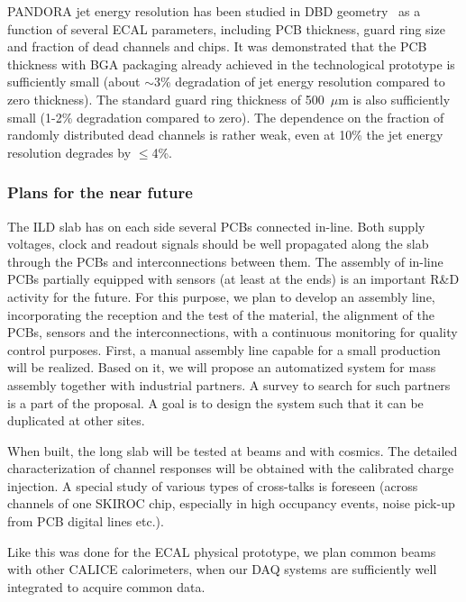 \documentclass{article}
\begin{document}
PANDORA jet energy resolution has been studied in DBD geometry~\cite{tokyo} as
a function of several ECAL parameters, including PCB thickness, guard ring
size and fraction of dead channels and chips. It was demonstrated that the PCB
thickness with BGA packaging already achieved in the technological prototype
is sufficiently small (about $\sim$3\% degradation of jet energy resolution
compared to zero thickness). The standard guard ring thickness of 500~$\mu$m
is also sufficiently small (1-2\% degradation compared to zero). The
dependence on the fraction of randomly distributed dead channels is rather
weak, even at 10\% the jet energy resolution degrades by $\le$4\%.

\subsubsection{Plans for the near future}

The ILD slab has on each side several PCBs connected in-line. Both supply
voltages, clock and readout signals should be well propagated along the slab
through the PCBs and interconnections between them.  The assembly of in-line
PCBs partially equipped with sensors (at least at the ends) is an important
R\&D activity for the future.  For this purpose, we plan to develop an
assembly line, incorporating the reception and the test of the material, the
alignment of the PCBs, sensors and the interconnections, with a continuous
monitoring for quality control purposes. First, a manual assembly line capable
for a small production will be realized. Based on it, we will propose an
automatized system for mass assembly together with industrial partners. A
survey to search for such partners is a part of the proposal. A goal is to
design the system such that it can be duplicated at other sites.

When built, the long slab will be tested at beams and with cosmics. The
detailed characterization of channel responses will be obtained with the
calibrated charge injection. A special study of various types of cross-talks
is foreseen (across channels of one SKIROC chip, especially in high occupancy
events, noise pick-up from PCB digital lines etc.).

Like this was done for the ECAL physical prototype, we plan common beams with
other CALICE calorimeters, when our DAQ systems are sufficiently well
integrated to acquire common data.
\end{document}
